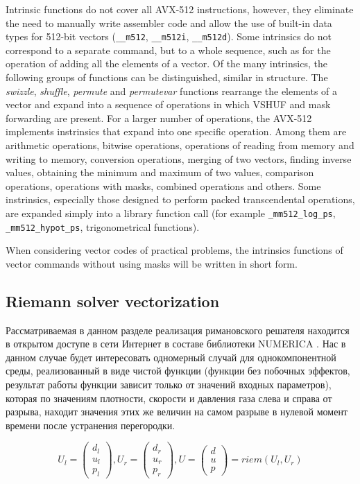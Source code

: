 \documentclass[
11pt,%
tightenlines,%
twoside,%
onecolumn,%
nofloats,%
nobibnotes,%
nofootinbib,%
superscriptaddress,%
noshowpacs,%
centertags]%
{revtex4}
\begin{document}
Intrinsic functions do not cover all AVX-512 instructions, however, they eliminate the need to manually write assembler code and allow the use of built-in data types for 512-bit vectors (\texttt{\_\_m512}, \texttt{\_\_m512i}, \texttt{\_\_m512d}).
Some intrinsics do not correspond to a separate command, but to a whole sequence, such as for the operation of adding all the elements of a vector.
Of the many intrinsics, the following groups of functions can be distinguished, similar in structure.
The \textit{swizzle}, \textit{shuffle}, \textit{permute} and \textit{permutevar} functions rearrange the elements of a vector and expand into a sequence of operations in which VSHUF and mask forwarding are present.
For a larger number of operations, the AVX-512 implements instrinsics that expand into one specific operation.
Among them are arithmetic operations, bitwise operations, operations of reading from memory and writing to memory, conversion operations, merging of two vectors, finding inverse values, obtaining the minimum and maximum of two values, comparison operations, operations with masks, combined operations and others.
Some instrinsics, especially those designed to perform packed transcendental operations, are expanded simply into a library function call (for example \texttt{\_mm512\_log\_ps}, \texttt{\_mm512\_hypot\_ps}, trigonometrical functions).

When considering vector codes of practical problems, the intrinsics functions of vector commands without using masks will be written in short form.

\subsection{Riemann solver vectorization}

Рассматриваемая в данном разделе реализация римановского решателя находится в открытом доступе в сети Интернет в составе библиотеки NUMERICA \cite{Numerica}.
Нас в данном случае будет интересовать одномерный случай для однокомпонентной среды, реализованный в виде чистой функции (функции без побочных эффектов, результат работы функции зависит только от значений входных параметров), которая по значениям плотности, скорости и давления газа слева и справа от разрыва, находит значения этих же величин на самом разрыве в нулевой момент времени после устранения перегородки.

\begin{equation}\label{eq:riemann}
U_l = \left( \begin{array}{ccc} d_l \\ u_l \\ p_l \end{array} \right),
U_r = \left( \begin{array}{ccc} d_r \\ u_r \\ p_r \end{array} \right),
U = \left( \begin{array}{ccc} d \\ u \\ p \end{array} \right) = riem(U_l, U_r)
\end{equation}
\end{document}
